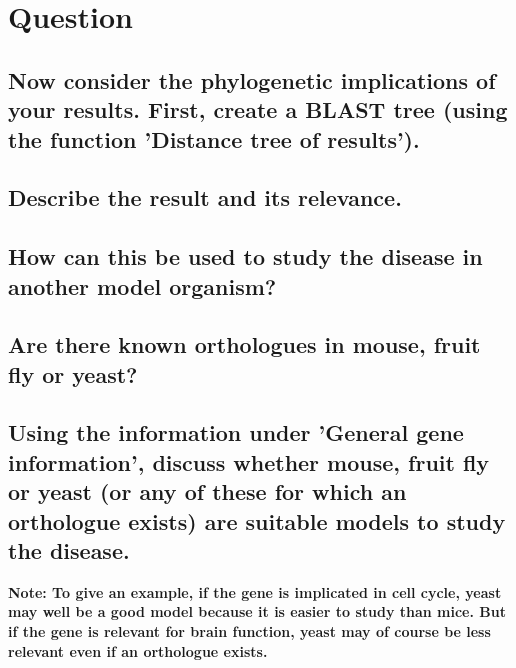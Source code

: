 \section{Question}

\subsection{Now consider the phylogenetic implications of your results. First, create a BLAST tree (using the function 'Distance tree of results').}


\subsection{Describe the result and its relevance.}


\subsection{How can this be used to study the disease in another model organism?}


\subsection{Are there known orthologues in mouse, fruit fly or yeast?}


\subsection{Using the information under 'General gene information', discuss whether mouse, fruit fly or yeast (or any of these for which an orthologue exists) are suitable models to study the disease.}

\textbf{Note: To give an example, if the gene is implicated in cell cycle, yeast may well be a good model because it is easier to study than mice. But if the gene is relevant for brain function, yeast may of course be less relevant even if an orthologue exists.}

\newpage
